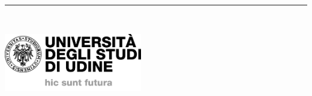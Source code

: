 %
\begin{titlepage}
	\flushright\hfill
	\vfill
	{\LARGE\thesisTitle\par}
	\rule[5pt]{\textwidth}{.4pt} \par
	{\Large\thesisName}
	\vfill
	\textit{\large\thesisDate} \\
\end{titlepage}


\begin{titlepage}
	\tgherosfont\centering

	\includegraphics[width=6cm]{gfx/uniud.jpeg} \\[2mm]
	\textsf{\thesisUniversityDepartment} \\
	\textsf{\thesisUniversityGroup} \\

	\vfill
	{\large \thesisSubject} \\[5mm]
	{\LARGE \color{ctcolortitle}\textbf{\thesisTitle} \\[10mm]}
	{\Large \thesisName} \\

	\vfill

	\normalfont{}
\end{titlepage}
